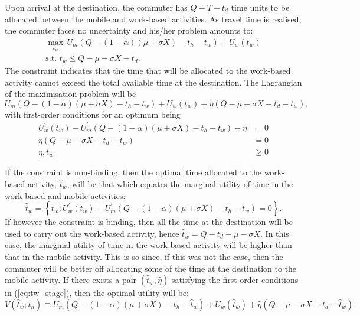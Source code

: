 \documentclass[12pt,a4paper,british]{article}
\begin{document}
Upon arrival at the destination, the commuter has $Q-T-t_{d}$ time units to be allocated between the mobile and work-based activities.
As travel time is realised, the commuter faces no uncertainty and his/her problem amounts to:
\begin{gather*}
\max_{t_{w}} \, U_{m}\left(Q - \left(1 - \alpha\right) \left(\mu + \sigma X\right) - t_{h} - t_{w}\right) + U_{w}\left(t_{w}\right)\\
\mbox{s.t. }t_{w}\leq Q-\mu-\sigma X-t_{d}.
\end{gather*}
The constraint indicates that the time that will be allocated to the work-based activity cannot exceed the total available time at the
destination. The Lagrangian of the maximisation problem will be%
\begin{equation*}
U_{m}\left(Q-\left(1-\alpha\right)\left(\mu+\sigma X\right)-t_{h}-t_{w}\right)+U_{w}\left(t_{w}\right)+\eta\left(Q-\mu-\sigma X-t_{d}-t_{w}\right),
\end{equation*}
with first-order conditions for an optimum being%
\begin{subequations}
\label{eq:tw_stage}
\begin{align}
U_{w}^{\prime}\left(t_{w}\right)-U_{m}^{\prime}\left(Q-\left(1-\alpha\right)\left(\mu+\sigma X\right)-t_{h}-t_{w}\right)-\eta & =0
\label{eq:stage2_wrt_tw}\\
\eta\left(Q-\mu-\sigma X-t_{d}-t_{w}\right) & =0\label{eq:stage2_compl}\\
\eta,t_{w} & \geq 0
\label{eq:stage2_nonnegative}
\end{align}
\end{subequations}

If the constraint is non-binding, then the optimal time allocated to the work-based activity, $\hat{t}_{w}$, will be that which equates the marginal utility of time in the work-based and mobile activities:
\begin{equation*}
\hat{t}_{w}=\left\{ t_{w}:U_{w}^{\prime}\left(t_{w}\right)-U_{m}^{\prime}\left(Q-\left(1-\alpha\right)\left(\mu+\sigma X\right)-t_{h}-t_{w}\right)=0\right\} .
\end{equation*}
If however the constraint is binding, then all the time at the destination will be used to carry out the work-based activity, hence $\hat{t}_{w}=Q-t_{d}-\mu-\sigma X$. In this case, the marginal utility of time in the work-based activity will be higher than that in the mobile activity. This is so since, if this was not the case, then the commuter will be better off allocating some of the time at the destination to the mobile activity. If there exists a pair $\left(\hat{t}_{w},\hat{\eta}\right)$ satisfying the first-order conditions in (\ref{eq:tw_stage}), then the optimal utility will be:
\begin{equation*}
V\left(\hat{t}_{w};t_{h}\right)\equiv U_{m}\left(Q-\left(1-\alpha\right)\left(\mu+\sigma X\right)-t_{h}-\hat{t}_{w}\right)+U_{w}\left(\hat{t}_{w}\right)+\hat{\eta}\left(Q-\mu-\sigma X-t_{d}-\hat{t}_{w}\right).
\end{equation*}
\end{document}

